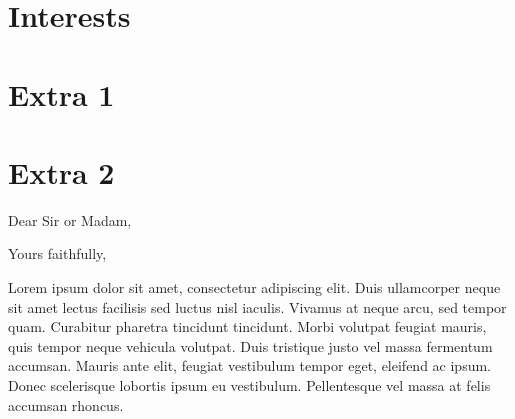 \documentclass[11pt,a4paper,sans]{moderncv}   %
\begin{document}
\section{Interests}

\section{Extra 1}

\renewcommand{\listitemsymbol}{-~}            %

\section{Extra 2}

\nocite{*}



\clearpage
\date{January 01, 1984}
\opening{Dear Sir or Madam,}
\closing{Yours faithfully,}
\makelettertitle

Lorem ipsum dolor sit amet, consectetur adipiscing elit. Duis ullamcorper neque sit amet lectus facilisis sed luctus nisl iaculis. Vivamus at neque arcu, sed tempor quam. Curabitur pharetra tincidunt tincidunt. Morbi volutpat feugiat mauris, quis tempor neque vehicula volutpat. Duis tristique justo vel massa fermentum accumsan. Mauris ante elit, feugiat vestibulum tempor eget, eleifend ac ipsum. Donec scelerisque lobortis ipsum eu vestibulum. Pellentesque vel massa at felis accumsan rhoncus.
\end{document}
